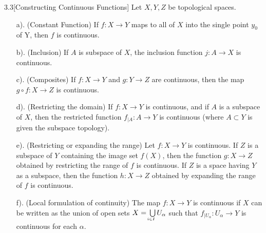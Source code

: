 \begin{customthm}{3.3}[Constructing Continuous Functions]
Let $X, Y, Z$ be topological spaces. 
\begin{enumerate}
    \item[a).] (Constant Function) If $f: X \longrightarrow Y$ maps to all of $X$ into the single point $y_0$ of Y, then $f$ is continuous.
    \item[b).] (Inclusion) If $A$ is subspace of $X$, the inclusion function $j: A \longrightarrow X$ is continuous.
    \item[c).] (Composites) If $f: X \longrightarrow Y$ and $g: Y \longrightarrow Z$ are continuous, then the map $g \circ f : X \longrightarrow Z$ is continuous.
    \item[d).] (Restricting the domain) If $f: X \longrightarrow Y$ is continuous, and if $A$ is a subspace of $X$, then the restricted function $f_{\vert A} : A \longrightarrow Y$ is continuous (where $A \subset Y$ is given the subspace topology).
    \item[e).] (Restricting or expanding the range) Let  $f: X \longrightarrow Y$ is continuous. If $Z$ is a subspace of $Y$ containing the image set $f(X)$, then the function $g: X \longrightarrow Z$ obtained by restricting the range of $f$ is continuous. If $Z$ is a space having $Y$ as a subspace, then the function $h: X \longrightarrow Z$ obtained by expanding the range of $f$ is continuous.  
    \item[f).] (Local formulation of continuity) The map $f: X \longrightarrow Y$ is continuous if $X$ can be written as the union of open sets $X = \underaccent{i\in I}{\bigcup}U_{\alpha}$ such that $f_{\vert U_{\alpha}}: U_{\alpha} \longrightarrow Y$ is continuous for each $\alpha$.
\end{enumerate}
\end{customthm}

\newpage

